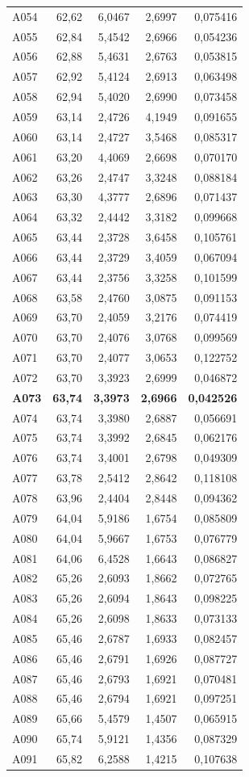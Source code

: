 \begin{longtable}{lrrrr}
A054 & 62,62 & 6,0467 & 2,6997 & 0,075416 \\
A055 & 62,84 & 5,4542 & 2,6966 & 0,054236 \\
A056 & 62,88 & 5,4631 & 2,6763 & 0,053815 \\
A057 & 62,92 & 5,4124 & 2,6913 & 0,063498 \\
A058 & 62,94 & 5,4020 & 2,6990 & 0,073458 \\
A059 & 63,14 & 2,4726 & 4,1949 & 0,091655 \\
A060 & 63,14 & 2,4727 & 3,5468 & 0,085317 \\
A061 & 63,20 & 4,4069 & 2,6698 & 0,070170 \\
A062 & 63,26 & 2,4747 & 3,3248 & 0,088184 \\
A063 & 63,30 & 4,3777 & 2,6896 & 0,071437 \\
A064 & 63,32 & 2,4442 & 3,3182 & 0,099668 \\
A065 & 63,44 & 2,3728 & 3,6458 & 0,105761 \\
A066 & 63,44 & 2,3729 & 3,4059 & 0,067094 \\
A067 & 63,44 & 2,3756 & 3,3258 & 0,101599 \\
A068 & 63,58 & 2,4760 & 3,0875 & 0,091153 \\
A069 & 63,70 & 2,4059 & 3,2176 & 0,074419 \\
A070 & 63,70 & 2,4076 & 3,0768 & 0,099569 \\
A071 & 63,70 & 2,4077 & 3,0653 & 0,122752 \\
A072 & 63,70 & 3,3923 & 2,6999 & 0,046872 \\
\textbf{A073} & \textbf{63,74} & \textbf{3,3973} & \textbf{2,6966} & \textbf{0,042526} \\
A074 & 63,74 & 3,3980 & 2,6887 & 0,056691 \\
A075 & 63,74 & 3,3992 & 2,6845 & 0,062176 \\
A076 & 63,74 & 3,4001 & 2,6798 & 0,049309 \\
A077 & 63,78 & 2,5412 & 2,8642 & 0,118108 \\
A078 & 63,96 & 2,4404 & 2,8448 & 0,094362 \\
A079 & 64,04 & 5,9186 & 1,6754 & 0,085809 \\
A080 & 64,04 & 5,9667 & 1,6753 & 0,076779 \\
A081 & 64,06 & 6,4528 & 1,6643 & 0,086827 \\
A082 & 65,26 & 2,6093 & 1,8662 & 0,072765 \\
A083 & 65,26 & 2,6094 & 1,8643 & 0,098225 \\
A084 & 65,26 & 2,6098 & 1,8633 & 0,073133 \\
A085 & 65,46 & 2,6787 & 1,6933 & 0,082457 \\
A086 & 65,46 & 2,6791 & 1,6926 & 0,087727 \\
A087 & 65,46 & 2,6793 & 1,6921 & 0,070481 \\
A088 & 65,46 & 2,6794 & 1,6921 & 0,097251 \\
A089 & 65,66 & 5,4579 & 1,4507 & 0,065915 \\
A090 & 65,74 & 5,9121 & 1,4356 & 0,087329 \\
A091 & 65,82 & 6,2588 & 1,4215 & 0,107638 \\
\end{longtable}
